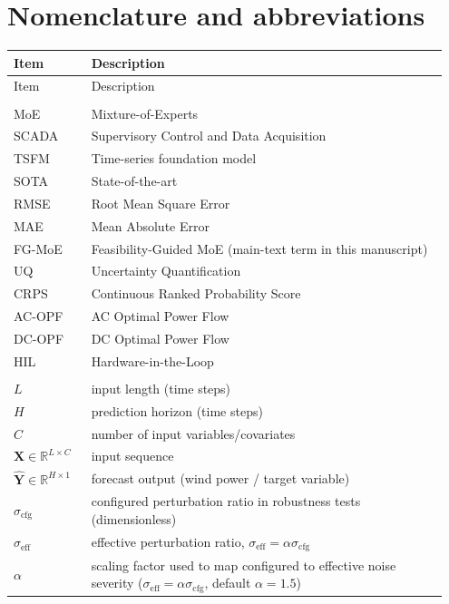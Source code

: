 ﻿\documentclass[review,1p,times]{elsarticle}
\begin{document}
\section{Nomenclature and abbreviations}
\begingroup
\footnotesize
\setlength{\tabcolsep}{3pt}
\renewcommand{\arraystretch}{0.92}
\noindent
\nolinenumbers
\begin{longtable}{@{}p{0.17\linewidth}L{0.78\linewidth}@{}}
\toprule
Item & Description \\
\midrule
\endfirsthead
\toprule
Item & Description \\
\midrule
\endhead
\bottomrule
\endlastfoot
{} \\
MoE & Mixture-of-Experts \\
SCADA & Supervisory Control and Data Acquisition \\
TSFM & Time-series foundation model \\
SOTA & State-of-the-art \\
RMSE & Root Mean Square Error \\
MAE & Mean Absolute Error \\
FG-MoE & Feasibility-Guided MoE (main-text term in this manuscript) \\
UQ & Uncertainty Quantification \\
CRPS & Continuous Ranked Probability Score \\
AC-OPF & AC Optimal Power Flow \\
DC-OPF & DC Optimal Power Flow \\
HIL & Hardware-in-the-Loop \\
\addlinespace[2pt]
 \\
$L$ & input length (time steps) \\
$H$ & prediction horizon (time steps) \\
$C$ & number of input variables/covariates \\
$\mathbf{X}\in\mathbb{R}^{L\times C}$ & input sequence \\
$\hat{\mathbf{Y}}\in\mathbb{R}^{H\times 1}$ & forecast output (wind power / target variable) \\
$\sigma_{\mathrm{cfg}}$ & configured perturbation ratio in robustness tests (dimensionless) \\
$\sigma_{\mathrm{eff}}$ & effective perturbation ratio, $\sigma_{\mathrm{eff}}=\alpha\sigma_{\mathrm{cfg}}$ \\
$\alpha$ & scaling factor used to map configured to effective noise severity ($\sigma_{\mathrm{eff}}=\alpha\sigma_{\mathrm{cfg}}$, default $\alpha=1.5$) \\

\end{longtable}
\end{document}
